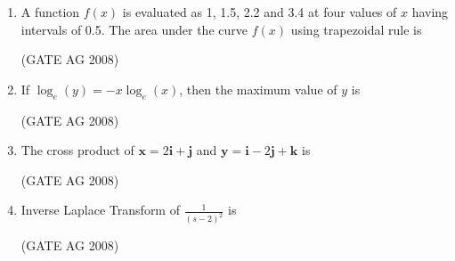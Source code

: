 \documentclass[journal]{IEEEtran}
\begin{document}
\begin{enumerate}
\medskip

\item 
 A function $f(x)$ is evaluated as 1, 1.5, 2.2 and 3.4 at four values of $x$ having intervals of 0.5. The area under the curve $f(x)$ using trapezoidal rule is 
\begin{enumerate}
 \end{enumerate}
 \hfill(GATE AG 2008)\\

\medskip


\item
 If $\log_e(y) = -x \log_e(x)$, then the maximum value of $y$ is 
\begin{enumerate}
\end{enumerate}
\hfill(GATE AG 2008)


\medskip

\item 
 The cross product of $\mathbf{x} = 2\mathbf{i}+\mathbf{j}$ and $\mathbf{y} = \mathbf{i}-2\mathbf{j}+\mathbf{k}$ is 
\begin{enumerate}
\end{enumerate}
\hfill(GATE AG 2008)\\

\medskip

\item 
 Inverse Laplace Transform of $\frac{1}{(s-2)^2}$ is 
\begin{enumerate}
\end{enumerate}
\hfill(GATE AG 2008)\\


\end{enumerate}
\end{document}
